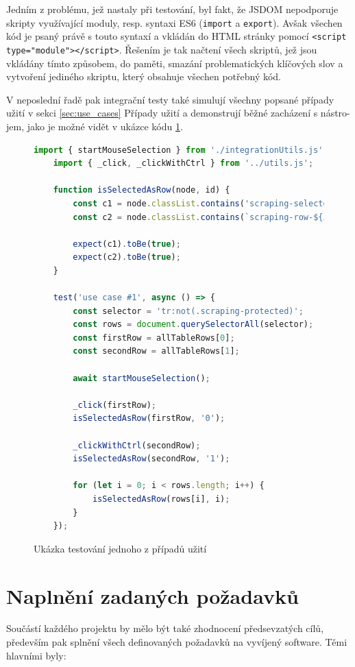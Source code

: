 \documentclass[thesis=B,czech]{FITthesis}[2012/06/26]
\begin{document}
Jedním z problému, jež nastaly při testování, byl fakt, že JSDOM nepodporuje skripty využívající moduly, resp. syntaxi ES6 (\verb|import| a \verb|export|). Avšak všechen kód je psaný právě s touto syntaxí a vkládán do HTML stránky pomocí \verb|<script type="module"></script>|. Řešením je tak načtení všech skriptů, jež jsou vkládány tímto způsobem, do paměti, smazání problematických klíčových slov a vytvoření jediného skriptu, který obsahuje všechen potřebný kód.

V neposlední řadě pak integrační testy také simulují všechny popsané případy užití v sekci \ref{sec:use_cases} Případy užití a demonstrují běžné zacházení s nástro-jem, jako je možné vidět v ukázce kódu \ref{code:integration_test}.

\begin{figure}
	\begin{lstlisting}[language=JavaScript]
	import { startMouseSelection } from './integrationUtils.js';
	import { _click, _clickWithCtrl } from '../utils.js';
	
	function isSelectedAsRow(node, id) {
		const c1 = node.classList.contains('scraping-selected-row');
		const c2 = node.classList.contains(`scraping-row-${id}`);
		
		expect(c1).toBe(true);
		expect(c2).toBe(true);
	}
	
	test('use case #1', async () => {
		const selector = 'tr:not(.scraping-protected)';
		const rows = document.querySelectorAll(selector);
		const firstRow = allTableRows[0];
		const secondRow = allTableRows[1];
		
		await startMouseSelection();
		
		_click(firstRow);
		isSelectedAsRow(firstRow, '0');
		
		_clickWithCtrl(secondRow);
		isSelectedAsRow(secondRow, '1');
	
		for (let i = 0; i < rows.length; i++) {
			isSelectedAsRow(rows[i], i);
		}
	});
	\end{lstlisting}
	\caption{Ukázka testování jednoho z případů užití}
	\label{code:integration_test}
\end{figure}


\section{Naplnění zadaných požadavků}
Součástí každého projektu by mělo být také zhodnocení předsevzatých cílů, především pak splnění všech definovaných požadavků na vyvíjený software. Těmi hlavními byly:
\end{document}
